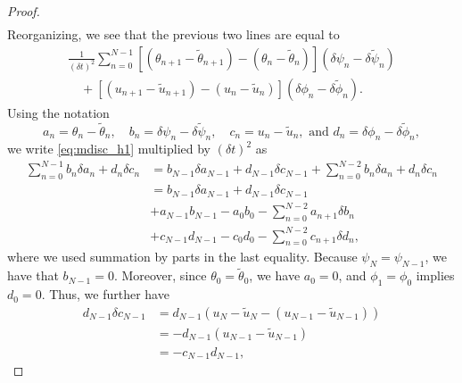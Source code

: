 \documentclass[12pt]{amsart}
\newcommand{\1}{{\chi}}
\newcommand{\lsb}{\left[}
\newcommand{\rsb}{\right]}
\newcommand{\lb}{\left(}
\newcommand{\rb}{\right)}
\theoremstyle{definition}
\begin{document}
\begin{proof}
\begin{align}
        \end{align}
                Reorganizing, we see that the previous two lines are equal to
                \begin{align}\label{eq:mdisc_h1}
                        \frac{1}{(\delta t)^2} \sum_{n=0}^{N-1} \lsb(\theta_{n+1}-\tilde\theta_{n+1})-(\theta_n-\tilde\theta_n)\rsb (\delta{\psi}_n-\delta\tilde{\psi}_n)\nonumber\\
                                \quad+\lsb(u_{n+1}-\tilde u_{n+1})-(u_n-\tilde u_n)\rsb (\delta{\phi}_n-\delta{\tilde \phi}_n).
                \end{align}
                Using the notation
                \begin{equation*}
                        a_n=\theta_n-\tilde \theta_n, \quad b_n=\delta{\psi}_n-\delta{\tilde\psi}_n, \quad c_n=u_n-\tilde u_n, \text{ and } d_n = \delta{\phi}_n-\delta{\tilde\phi}_n,
                \end{equation*}
                we write \eqref{eq:mdisc_h1} multiplied by $(\delta t)^2$ as
                \begin{align}\label{eq:aux_disc}
                        \sum_{n=0}^{N-1} b_n \delta a_n + d_n \delta c_n &= b_{N-1}\delta a_{N-1} + d_{N-1}\delta c_{N-1} +\sum_{n=0}^{N-2} b_n \delta a_n + d_n \delta c_n \nonumber\\
                        & = b_{N-1}\delta a_{N-1} + d_{N-1}\delta c_{N-1} \nonumber\\
                        & + a_{N-1}b_{N-1} - a_0 b_0 -\sum_{n=0}^{N-2} a_{n+1} \delta b_n \nonumber\\
                        & + c_{N-1}d_{N-1} - c_0d_0 - \sum_{n=0}^{N-2} c_{n+1} \delta d_n,
                \end{align}
                where we used summation by parts in the last equality.
                Because  $\psi_N=\psi_{N-1}$, we have that $b_{N-1}=0$. 
                Moreover, since $\theta_0=\tilde\theta_0$, we have $a_0=0$, and $\phi_1=\phi_0$ implies
                $d_0=0$.
                                Thus, we further have
                \begin{align*}
                        d_{N-1}\delta c_{N-1} &= d_{N-1}\lb u_N-\tilde u_N - (u_{N-1}-\tilde u_{N-1}) \rb \\
                                &= -d_{N-1}(u_{N-1}-\tilde u_{N-1})\\
                                &= -c_{N-1}d_{N-1},
                \end{align*}

\end{proof}
\end{document}
